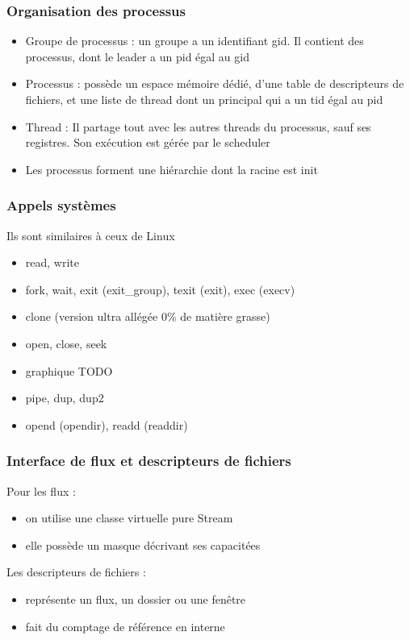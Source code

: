 \documentclass{beamer}
\begin{document}
\begin{frame}
    \frametitle{Organisation des processus}
    \begin{itemize}
        \item Groupe de processus : un groupe a un identifiant gid. Il contient des processus, dont le leader a un pid égal au gid
        \item Processus : possède un espace mémoire dédié, d'une table de descripteurs de fichiers, et une liste de thread dont un principal qui a un tid égal au pid
        \item Thread : Il partage tout avec les autres threads du processus, sauf ses registres. Son exécution est gérée par le scheduler
        \item Les processus forment une hiérarchie dont la racine est init
    \end{itemize}
\end{frame}

\begin{frame}
    \frametitle{Appels systèmes}
    Ils sont similaires à ceux de Linux
    \begin{itemize}
        \item read, write
        \item fork, wait, exit (exit\_group), texit (exit), exec (execv)
        \item clone (version ultra allégée 0\% de matière grasse)
        \item open, close, seek
        \item graphique TODO
        \item pipe, dup, dup2
        \item opend (opendir), readd (readdir)
    \end{itemize}
\end{frame}

\begin{frame}
    \frametitle{Interface de flux et descripteurs de fichiers}
    Pour les flux :
    \begin{itemize}
        \item on utilise une classe virtuelle pure Stream
        \item elle possède un masque décrivant ses capacitées
    \end{itemize}
    Les descripteurs de fichiers :
    \begin{itemize}
        \item représente un flux, un dossier ou une fenêtre
        \item fait du comptage de référence en interne
    \end{itemize}
\end{frame}
\end{document}
